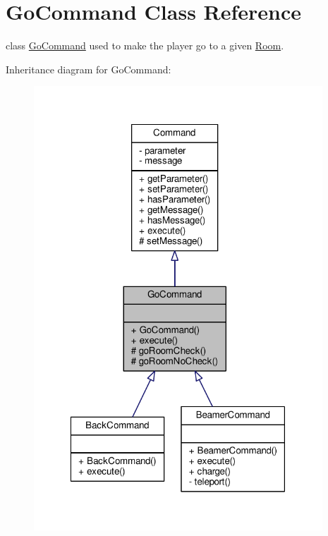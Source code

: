 \hypertarget{classGoCommand}{\section{Go\-Command Class Reference}
\label{classGoCommand}
}


class \hyperlink{classGoCommand}{Go\-Command} used to make the player go to a given \hyperlink{classRoom}{Room}.  




Inheritance diagram for Go\-Command\-:
\nopagebreak
\begin{figure}[H]
\begin{center}
\leavevmode
\includegraphics[width=307pt]{classGoCommand__inherit__graph}
\end{center}
\end{figure}


